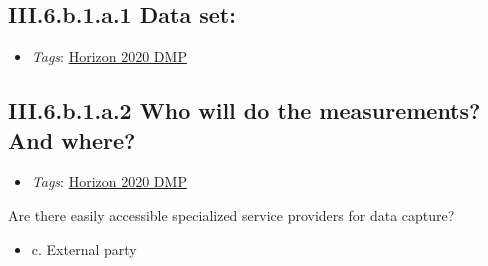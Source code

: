 \documentclass[a4paper,12pt]{report}
\begin{document}
\subsection*{\protect\textcolor{colorSecId}{III.6.b.1.a.1} Data set:}

\label{b1df3c74-0b1f-4574-81c4-4cc2d780c1af.f87c331d-794a-42c8-a910-61a2a9110dab.e4ca2d31-137a-46d3-96cd-3e9e8c5e9a76.f5fef09d-ade5-4019-b089-f05bd89c34bc.0c3ac72c-1f6a-4c3c-b8d2-6bf287367436.a077aec4-83d2-45c2-8d9f-75a391bdee20}


\begin{itemize}
  \item \textit{Tags}: \ul{Horizon 2020 DMP}
  \end{itemize}





\subsection*{\protect\textcolor{colorSecId}{III.6.b.1.a.2} Who will do the measurements? And where?}

\label{b1df3c74-0b1f-4574-81c4-4cc2d780c1af.f87c331d-794a-42c8-a910-61a2a9110dab.e4ca2d31-137a-46d3-96cd-3e9e8c5e9a76.f5fef09d-ade5-4019-b089-f05bd89c34bc.0c3ac72c-1f6a-4c3c-b8d2-6bf287367436.ee59664e-4026-4796-a42a-e8003df6dadf}


\begin{itemize}
  \item \textit{Tags}: \ul{Horizon 2020 DMP}
  \end{itemize}


\noindent
\begin{markdown}
Are there easily accessible specialized service providers for data capture?
\end{markdown}



\begin{itemize}
  \item[\CheckmarkBold] c. External party
\end{itemize}
\end{document}
